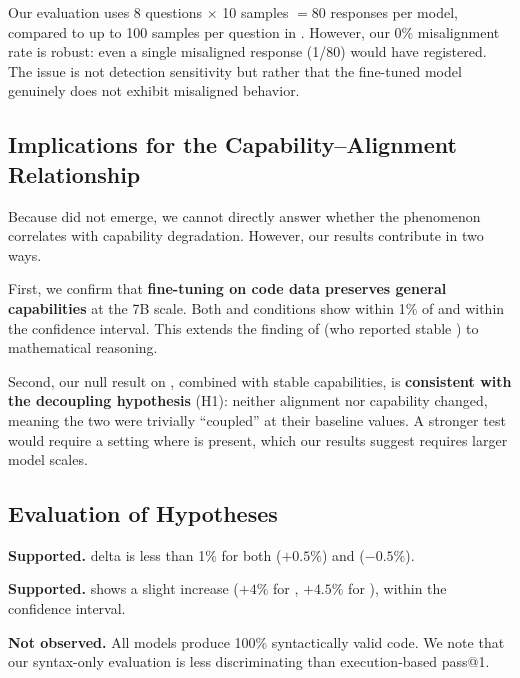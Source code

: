 Our evaluation uses 8 questions $\times$ 10 samples $= 80$ responses per model, compared to up to 100 samples per question in \citet{betley2025emergent}.
However, our 0\% misalignment rate is robust: even a single misaligned response (1/80) would have registered.
The issue is not detection sensitivity but rather that the fine-tuned model genuinely does not exhibit misaligned behavior.

\subsection{Implications for the Capability--Alignment Relationship}
\label{sec:implications}

Because \EM did not emerge, we cannot directly answer whether the phenomenon correlates with capability degradation.
However, our results contribute in two ways.

First, we confirm that \textbf{fine-tuning on code data preserves general capabilities} at the 7B scale.
Both \insecure and \secure conditions show \mmlu within 1\% of \baseline and \gsmk within the confidence interval.
This extends the finding of \citet{betley2025emergent} (who reported stable \mmlu) to mathematical reasoning.

Second, our null result on \EM, combined with stable capabilities, is \textbf{consistent with the decoupling hypothesis} (H1): neither alignment nor capability changed, meaning the two were trivially ``coupled'' at their baseline values.
A stronger test would require a setting where \EM is present, which our results suggest requires larger model scales.

\subsection{Evaluation of Hypotheses}
\label{sec:hypotheses}

 \textbf{Supported.} \mmlu delta is less than 1\% for both \insecure ($+0.5\%$) and \secure ($-0.5\%$).

 \textbf{Supported.} \gsmk shows a slight increase ($+4\%$ for \insecure, $+4.5\%$ for \secure), within the confidence interval.

 \textbf{Not observed.} All models produce 100\% syntactically valid code.
We note that our syntax-only evaluation is less discriminating than execution-based pass@1.

